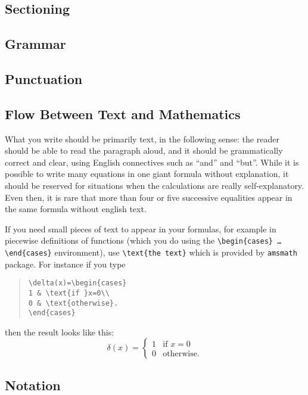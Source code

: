 \subsection{Sectioning}
\subsection{Grammar}
\subsection{Punctuation}
\subsection{Flow Between Text and Mathematics}

What you write should be primarily text, in the following sense: the reader should be able to read the paragraph aloud, and it should be grammatically correct and clear, using English connectives such as ``and'' and ``but''. While it is possible to write many equations in one giant formula without explanation, it should be reserved for situations when the calculations are really self-explanatory. Even then, it is rare that more than four or five successive equalities appear in the same formula without english text.

If you need small pieces of text to appear in your formulas, for example in piecewise definitions of functions (which you do using the
{\tt \verb|\begin{cases}| \ldots \verb|\end{cases}|}
environment), use
{\tt \verb|\text{the text}|} which is provided by \texttt{amsmath} package. For instance if you type
\begin{quote}
\begin{verbatim}
\delta(x)=\begin{cases}
1 & \text{if }x=0\\
0 & \text{otherwise}.
\end{cases}
\end{verbatim}
\end{quote}
then the result looks like this:
\[
\delta(x)=\begin{cases}
1 & \text{if }x=0\\
0 & \text{otherwise}.
\end{cases}
\]

\subsection{Notation}

